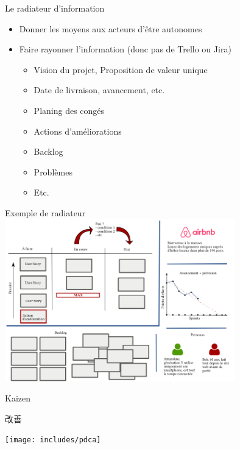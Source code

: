 \documentclass{beamer}
\begin{document}
\begin{frame}{Le radiateur d'information}
  \begin{itemize}
    \item Donner les moyens aux acteurs d'être autonomes
    \item Faire rayonner l'information (donc pas de Trello ou Jira)

    \begin{itemize}
      \item Vision du projet, Proposition de valeur unique
      \item Date de livraison, avancement, etc.
      \item Planing des congés
      \item Actions d'améliorations
      \item Backlog
      \item Problèmes
      \item Etc.
    \end{itemize}
  \end{itemize}
\end{frame}

\begin{frame}{Exemple de radiateur}
  \center
  \includegraphics[width=10cm]{includes/radiateur}
\end{frame}

\begin{frame}{Kaizen 
    {\begin{CJK*}{UTF8}{mj} 改善 \end{CJK*}}
  }
  \center
  \texttt{[image: includes/pdca]}
\end{frame}
\end{document}
